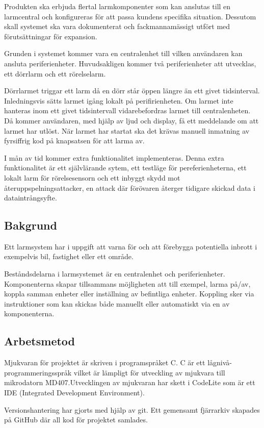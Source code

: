 \documentclass[a4paper]{article}
\begin{document}
Produkten ska erbjuda flertal larmkomponenter som kan anslutas till en larmcentral och konfigureras för att passa kundens specifika situation. Dessutom skall systemet ska vara dokumenterat och fackmannamässigt utfört med förutsättningar för expansion.

Grunden i systemet kommer vara en centralenhet till vilken användaren kan ansluta periferienheter. Huvudsakligen kommer två periferienheter att utvecklas, ett dörrlarm och ett rörelselarm.

Dörrlarmet triggar ett larm då en dörr står öppen längre än ett givet tidsinterval. Inledningsvis sätts larmet igång lokalt på perifirienheten. Om larmet inte hanteras inom ett givet tidsintervall vidarebefordras larmet till centralenheten. Då kommer användaren, med hjälp av ljud och display, få ett meddelande om att larmet har utlöst. När larmet har startat ska det krävas manuell inmatning av fyrsiffrig kod på knapsatsen för att larma av.

I mån av tid kommer extra funktionalitet implementeras. Denna extra funktionalitet är ett självlärande sytem, ett testläge för pereferienheterna, ett lokalt larm för rörelsesensorn och ett inbyggt skydd mot återuppspelningsattacker, en attack där förövaren återger tidigare skickad data i dataintrångsyfte.

\subsection{Bakgrund}
Ett larmsystem har i uppgift att varna för och att förebygga potentiella inbrott i exempelvis bil, fastighet eller ett område.

Beståndsdelarna i larmsystemet är en centralenhet och periferienheter. Komponenterna skapar tillsammans möjligheten att till exempel, larma på/av, koppla samman enheter eller inställning av befintliga enheter. Koppling sker via instruktioner som kan skickas både manuellt eller automatiskt via en av komponenterna.

\subsection{Arbetsmetod}

Mjukvaran för projektet är skriven i programspråket C. C är ett lågnivå-programmeringsspråk vilket är lämpligt för utveckling av mjukvara till mikrodatorn MD407.Utvecklingen av mjukvaran har skett i CodeLite som är ett IDE (Integrated Development Environment).

Versionshantering har gjorts med hjälp av git. Ett gemensamt fjärrarkiv skapades på GitHub där all kod för projektet samlades.
\end{document}
